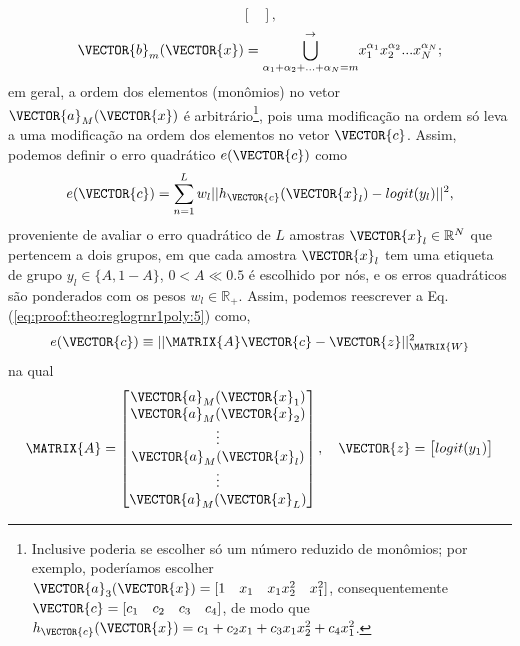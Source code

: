 \begin{myproofT}
\begin{equation}
\begin{bmatrix}
\end{bmatrix},
\end{equation}
\begin{equation}\label{eq:proof:theo:reglogrnr1poly:4}
\VECTOR{b}_m(\VECTOR{x})=
{\bigcup\limits_{\alpha_1+\alpha_2+...+\alpha_N=m}^{\rightarrow}}{x_1^{\alpha_1} x_2^{\alpha_2} ... x_N^{\alpha_N}};
\end{equation}
em geral, a ordem dos elementos (monômios) no vetor $\VECTOR{a}_M(\VECTOR{x})$ 
é arbitrário\footnote{Inclusive poderia se escolher só um número reduzido de monômios;
por exemplo, poderíamos escolher $\VECTOR{a}_3(\VECTOR{x})=[1\quad x_1\quad x_1 x_2^2\quad x_1^2]$,
consequentemente $\VECTOR{c}=[c_1\quad c_2\quad c_3\quad c_4]$,
de modo que $h_{\VECTOR{c}}(\VECTOR{x})=c_1 +c_2 x_1+c_3 x_1 x_2^2+c_4 x_1^2$.}, 
pois uma modificação na ordem só leva a uma modificação na ordem dos elementos no vetor $\VECTOR{c}$.
Assim, podemos definir o erro quadrático $e(\VECTOR{c})$ como
\begin{equation}\label{eq:proof:theo:reglogrnr1poly:5}
e(\VECTOR{c}) =  \sum_{n=1}^{L} w_l||h_{\VECTOR{c}}(\VECTOR{x}_l)-logit(y_l)||^2,
\end{equation}
proveniente de avaliar o erro quadrático de $L$ amostras $\VECTOR{x}_l \in \mathbb{R}^{N}$ que pertencem a dois grupos, 
em que cada amostra $\VECTOR{x}_l$ tem uma etiqueta de grupo $y_l\in \{A,1-A\}$, 
 $0<A\ll 0.5$ é escolhido por nós, 
e os erros quadráticos são ponderados com os pesos $w_l \in \mathbb{R}_+$.
Assim, podemos reescrever a Eq. (\ref{eq:proof:theo:reglogrnr1poly:5}) como,
\begin{equation}\label{eq:proof:theo:reglogrnr1poly:6}
e(\VECTOR{c}) \equiv ||\MATRIX{A}\VECTOR{c}-\VECTOR{z}||_{\MATRIX{W}}^2 
\end{equation}
na qual
\begin{equation}\label{eq:proof:reglogrnr1poly:7}
\MATRIX{A}=\begin{bmatrix}
\VECTOR{a}_M(\VECTOR{x}_1)\\
\VECTOR{a}_M(\VECTOR{x}_2)\\
\vdots\\
\VECTOR{a}_M(\VECTOR{x}_l)\\
\vdots\\
\VECTOR{a}_M(\VECTOR{x}_L)\\
\end{bmatrix},
\quad
\VECTOR{z}=
\begin{bmatrix}
logit(y_1)  \\

\end{bmatrix}
\end{equation}
\end{myproofT}
